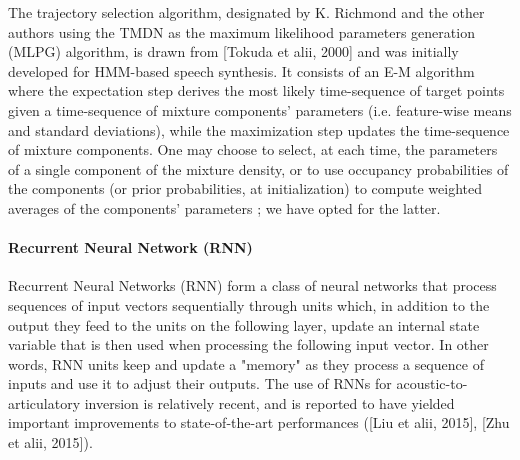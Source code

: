 The trajectory selection algorithm, designated by K. Richmond and the other authors using the TMDN as the maximum likelihood parameters generation (MLPG) algorithm, is drawn from [Tokuda et alii, 2000] and was initially developed for HMM-based speech synthesis. It consists of an E-M algorithm where the expectation step derives the most likely time-sequence of target points given a time-sequence of mixture components' parameters (i.e. feature-wise means and standard deviations), while the maximization step updates the time-sequence of mixture components. One may choose to select, at each time, the parameters of a single component of the mixture density, or to use occupancy probabilities of the components (or prior probabilities, at initialization) to compute weighted averages of the components' parameters ; we have opted for the latter.\\



\paragraph{Recurrent Neural Network (RNN)}

Recurrent Neural Networks (RNN) form a class of neural networks that process sequences of input vectors sequentially through units which, in addition to the output they feed to the units on the following layer, update an internal state variable that is then used when processing the following input vector. In other words, RNN units keep and update a "memory" as they process a sequence of inputs and use it to adjust their outputs. The use of RNNs for acoustic-to-articulatory inversion is relatively recent, and is reported to have yielded important improvements to state-of-the-art performances ([Liu et alii, 2015], [Zhu et alii, 2015]).\\

